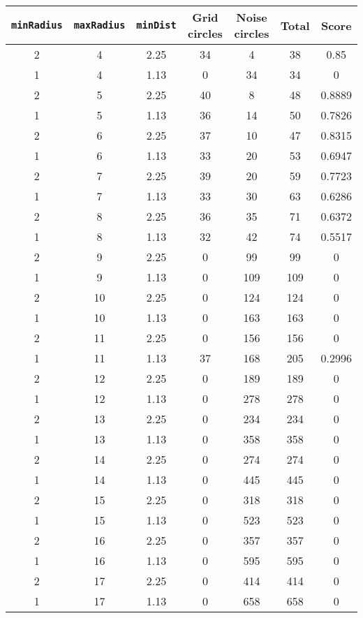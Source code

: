 \documentclass[letterpaper, 12pt]{article}
\begin{document}
\begin{longtable}{|c|c|c|c|c|c|c|}
\hline
\textbf{\texttt{minRadius}} & \textbf{\texttt{maxRadius}} & \textbf{\texttt{minDist}} & \textbf{Grid circles} & \textbf{Noise circles} & \textbf{Total} & \textbf{Score} \\
\hline
2 & 4 & 2.25 & 34 & 4 & 38 & 0.85 \\
\hline
1 & 4 & 1.13 & 0 & 34 & 34 & 0 \\
\hline
2 & 5 & 2.25 & 40 & 8 & 48 & 0.8889 \\
\hline
1 & 5 & 1.13 & 36 & 14 & 50 & 0.7826 \\
\hline
2 & 6 & 2.25 & 37 & 10 & 47 & 0.8315 \\
\hline
1 & 6 & 1.13 & 33 & 20 & 53 & 0.6947 \\
\hline
2 & 7 & 2.25 & 39 & 20 & 59 & 0.7723 \\
\hline
1 & 7 & 1.13 & 33 & 30 & 63 & 0.6286 \\
\hline
2 & 8 & 2.25 & 36 & 35 & 71 & 0.6372 \\
\hline
1 & 8 & 1.13 & 32 & 42 & 74 & 0.5517 \\
\hline
2 & 9 & 2.25 & 0 & 99 & 99 & 0 \\
\hline
1 & 9 & 1.13 & 0 & 109 & 109 & 0 \\
\hline
2 & 10 & 2.25 & 0 & 124 & 124 & 0 \\
\hline
1 & 10 & 1.13 & 0 & 163 & 163 & 0 \\
\hline
2 & 11 & 2.25 & 0 & 156 & 156 & 0 \\
\hline
1 & 11 & 1.13 & 37 & 168 & 205 & 0.2996 \\
\hline
2 & 12 & 2.25 & 0 & 189 & 189 & 0 \\
\hline
1 & 12 & 1.13 & 0 & 278 & 278 & 0 \\
\hline
2 & 13 & 2.25 & 0 & 234 & 234 & 0 \\
\hline
1 & 13 & 1.13 & 0 & 358 & 358 & 0 \\
\hline
2 & 14 & 2.25 & 0 & 274 & 274 & 0 \\
\hline
1 & 14 & 1.13 & 0 & 445 & 445 & 0 \\
\hline
2 & 15 & 2.25 & 0 & 318 & 318 & 0 \\
\hline
1 & 15 & 1.13 & 0 & 523 & 523 & 0 \\
\hline
2 & 16 & 2.25 & 0 & 357 & 357 & 0 \\
\hline
1 & 16 & 1.13 & 0 & 595 & 595 & 0 \\
\hline
2 & 17 & 2.25 & 0 & 414 & 414 & 0 \\
\hline
1 & 17 & 1.13 & 0 & 658 & 658 & 0 \\

\end{longtable}
\end{document}
